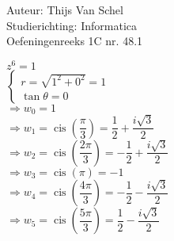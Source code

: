 \documentclass[a4paper]{article}
\newcommand{\cis}{\operatorname{cis}}
\begin{document}
  
\noindent \large Auteur: Thijs Van Schel \\
\noindent \large Studierichting: Informatica\\
\noindent \large Oefeningenreeks 1C nr. 48.1\\

\medskip

\normalsize

$z^6 = 1$ \\

$\left\{
\begin{array}{l}
r = \sqrt{1^2+0^2} = 1 \\

\tan\theta = 0
\end{array}
\right.$ \\

$\Rightarrow w_0 = 1$ \\

$\Rightarrow w_1 = \cis\left(\dfrac{\pi}{3}\right) = \dfrac{1}{2} + \dfrac{i\sqrt{3}}{2}$ \\

$\Rightarrow w_2 = \cis\left(\dfrac{2\pi}{3}\right) = -\dfrac{1}{2} + \dfrac{i\sqrt{3}}{2}$ \\

$\Rightarrow w_3 = \cis\left(\pi\right) = -1$ \\

$\Rightarrow w_4 = \cis\left(\dfrac{4\pi}{3}\right) = -\dfrac{1}{2} - \dfrac{i\sqrt{3}}{2}$ \\

$\Rightarrow w_5 = \cis\left(\dfrac{5\pi}{3}\right) = \dfrac{1}{2} - \dfrac{i\sqrt{3}}{2}$

\begin{thebibliography}{999}
\end{thebibliography}
\end{document}
